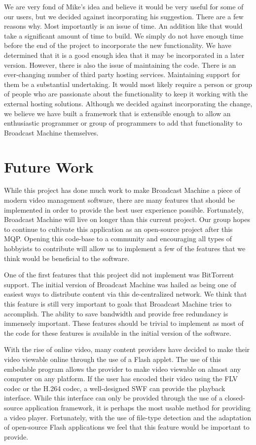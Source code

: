 \documentclass[a4paper,12pt]{report}
\begin{document}
We are very fond of Mike's idea and believe it would be very useful for some of our users, but we decided against 
incorporating his suggestion. 
There are a few reasons why. 
Most importantly is an issue of time. 
An addition like that would take a significant amount of time to build. 
We simply do not have enough time before the end of the project to incorporate the new functionality. 
We have determined that it is a good enough idea that it may be incorporated in a later version. 
However, there is also the issue of maintaining the code. 
There is an ever-changing number of third party hosting services. 
Maintaining support for them be a substantial undertaking. 
It would most likely require a person or group of people who are passionate about the functionality to keep it working 
with the external hosting solutions. 
Although we decided against incorporating the change, we believe we have built a framework that is extensible enough to 
allow an enthusiastic programmer or group of programmers to add that functionality to Broadcast Machine themselves.

\chapter{Future Work}
While this project has done much work to make Broadcast Machine a piece of modern video management software, there are many features that should be implemented in order to provide the best user experience possible.
Fortunately, Broadcast Machine will live on longer than this current project.
Our group hopes to continue to cultivate this application as an open-source project after this MQP.
Opening this code-base to a community and encouraging all types of hobbyists to contribute will allow us to implement a few of the features that we think would be beneficial to the software.

One of the first features that this project did not implement was BitTorrent support.
The initial version of Broadcast Machine was hailed as being one of easiest ways to distribute content via this de-centralized network.
We think that this feature is still very important to goals that Broadcast Machine tries to accomplish.
The ability to save bandwidth and provide free redundancy is immensely important.
These features should be trivial to implement as most of the code for these features is available in the initial version of the software.

With the rise of online video, many content providers have decided to make their video viewable online through the use of a Flash applet.
The use of this embedable program allows the provider to make video viewable on almost any computer on any platform.
If the user has encoded their video using the FLV codec or the H.264 codec, a well-designed SWF can provide the playback interface.
While this interface can only be provided through the use of a closed-source application framework, it is perhaps the most usable method for providing a video player.
Fortunately, with the use of file-type detection and the adaptation of open-source Flash applications we feel that this feature would be important to provide.
\end{document}
